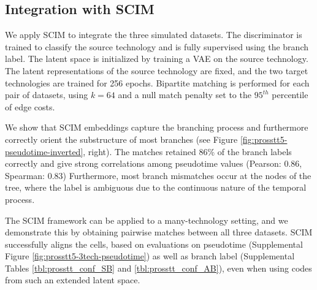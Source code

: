 \subsection{Integration with SCIM}
We apply SCIM to integrate the three simulated datasets.
The discriminator is trained to classify the source technology and is fully supervised using the branch label.
The latent space is initialized by training a VAE on the source technology.
The latent representations of the source technology are fixed,
and the two target technologies are trained for 256 epochs.
Bipartite matching is performed for each pair of datasets,
using $k=64$ and a null match penalty set to the $95^{th}$ percentile of edge costs. 

We show that SCIM embeddings capture the branching process and furthermore correctly orient the substructure of most branches (see Figure \ref{fig:prosstt5-pseudotime-inverted}, right). 
The matches retained 86\% of the branch labels correctly and give strong correlations among pseudotime values (Pearson: 0.86, Spearman: 0.83)
Furthermore, most branch mismatches occur at the nodes of the tree, where the label is ambiguous due to the continuous nature of the temporal process.


The SCIM framework can be applied to a many-technology setting, and we demonstrate this by obtaining pairwise matches between all three datasets. 
SCIM successfully aligns the cells, based on evaluations on pseudotime (Supplemental Figure \ref{fig:prosstt5-3tech-pseudotime}) as well as branch label (Supplemental Tables \ref{tbl:prosstt_conf_SB} and  \ref{tbl:prosstt_conf_AB}), even when using codes from such an extended latent space. 

